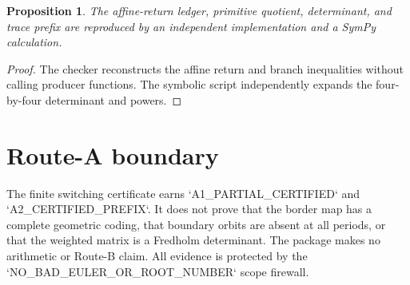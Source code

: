 \documentclass[10pt]{article}
\newtheorem{proposition}{Proposition}
\begin{document}
\begin{proposition}
The affine-return ledger, primitive quotient, determinant, and trace prefix
are reproduced by an independent implementation and a SymPy calculation.
\end{proposition}
\begin{proof}
The checker reconstructs the affine return and branch inequalities without
calling producer functions.  The symbolic script independently expands the
four-by-four determinant and powers.
\end{proof}

\section{Route-A boundary}
The finite switching certificate earns
`A1\_PARTIAL\_CERTIFIED` and `A2\_CERTIFIED\_PREFIX`.  It does not prove that
the border map has a complete geometric coding, that boundary orbits are
absent at all periods, or that the weighted matrix is a Fredholm determinant.
The package makes no arithmetic or Route-B claim.  All evidence is protected
by the `NO\_BAD\_EULER\_OR\_ROOT\_NUMBER` scope firewall.
\end{document}
